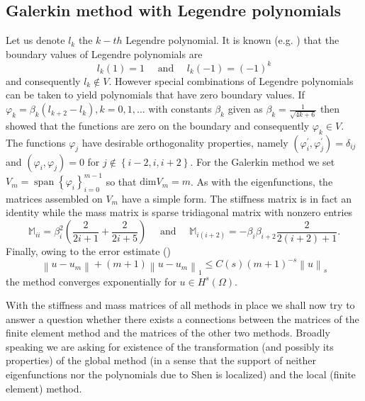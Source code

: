 \documentclass[a4paper,10pt]{article}
\newcommand{\norm}[1]{\ensuremath{\left\|#1\right\|}}
\newcommand{\inner}[2]{\ensuremath{\left(#1, #2\right)}}
\newcommand{\Mmat}{\ensuremath{\mathbb{M}}}
\DeclareMathOperator{\spn}{span}
\begin{document}
  \subsection{Galerkin method with Legendre polynomials}
  Let us denote $l_k$ the $k-th$ Legendre polynomial. It is known
  (e.g. \cite{shen_book}) that the boundary values of Legendre polynomials are
  \[
    l_k(1) = 1\quad\text{ and }\quad l_k(-1) = (-1)^k
  \]
  and consequently $l_k\notin V$. However special combinations of Legendre
  polynomials can be taken to yield polynomials that have zero boundary values.
  If $\varphi_k=\beta_k\left(l_{k+2} - l_k\right), k=0, 1,\dots$ with constants
  $\beta_k$ given as $\beta_k = \frac{1}{\sqrt{4k + 6}}$ then
  \cite{shen_leg} showed that the functions are zero on the boundary and
  consequently $\varphi_k\in V$. The functions $\varphi_j$ have desirable
  orthogonality properties, namely
  $\inner{\varphi_i^{\prime}}{\varphi_j^{\prime}}=\delta_{ij}$ and
  $\inner{\varphi_i}{\varphi_j}=0$ for $j\notin\left\{i-2, i, i+2\right\}$.
  For the Galerkin method we set $V_m=\spn\left\{\varphi_i\right\}_{i=0}^{m-1}$
  so that $\text{dim}V_m=m$. As with the eigenfunctions, the matrices assembled
  on $V_m$ have a simple form. The stiffness matrix is in fact an identity
  while the mass matrix is sparse tridiagonal matrix with nonzero entries
  \[
    \Mmat_{ii} = \beta_i^2\left(\frac{2}{2i+1}+\frac{2}{2i+5}\right)
    \quad{\text{ and }}\quad
    \Mmat_{i(i+2)} = -\beta_i\beta_{i+2}\frac{2}{2(i+2)+1}.
  \]
  Finally, owing to the error estimate (\cite{shen_leg})
  \[
    \norm{u-u_m} + (m+1)\norm{u-u_m}_1 \leq C(s)(m+1)^{-s}\norm{u}_s
  \]
  the method converges exponentially for $u\in H^s\left({\Omega}\right)$.

  With the stiffness and mass matrices of all methods in place we shall now
  try to answer a question whether there exists a connections between the
  matrices of the finite element method and the matrices of the other two
  methods. Broadly speaking we are asking for existence of the transformation
  (and possibly its properties) of the global method (in a sense that the
  support of neither eigenfunctions nor the polynomials due to Shen is localized)
  and the local (finite element) method.

\end{document}
